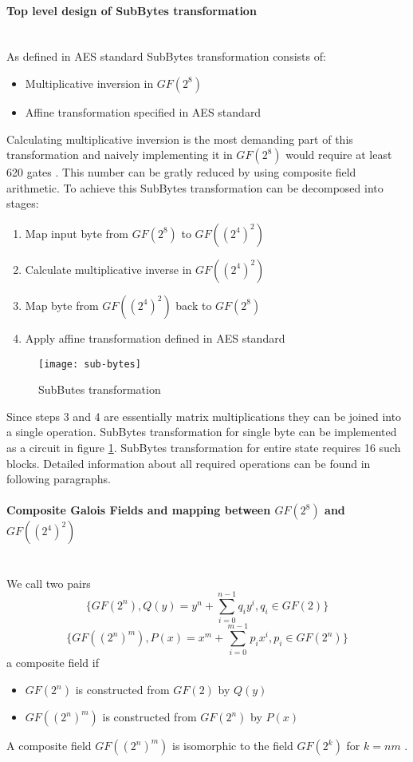 \paragraph{Top level design of SubBytes transformation}\mbox{}\\
As defined in AES standard \cite{aes-standard} SubBytes transformation consists of:
\begin{itemize}[nolistsep]
\item Multiplicative inversion in $GF(2^8)$
\item Affine transformation specified in AES standard \cite{aes-standard}
\end{itemize}
Calculating multiplicative inversion is the most demanding part of this transformation and naively implementing it in $GF(2^8)$ would require at least 620 gates \cite{vlsi}. This number can be gratly reduced by using composite field arithmetic. To achieve this SubBytes transformation can be decomposed into stages:
\begin{enumerate}[nolistsep]
\item Map input byte from $GF(2^8)$ to $GF((2^4)^2)$ 
\item Calculate multiplicative inverse in $GF((2^4)^2)$
\item Map byte from $GF((2^4)^2)$ back to $GF(2^8)$
\item Apply affine transformation defined in AES standard \cite{aes-standard}
\end{enumerate}

\begin{figure}[!h]
\centering
\texttt{[image: sub-bytes]}
\caption{SubButes transformation}
\label{fig:sub-single-byte}
\end{figure}

Since steps 3 and 4 are essentially matrix multiplications they can be joined into a single operation. SubBytes transformation for single byte can be implemented as a circuit in figure \ref{fig:sub-single-byte}. SubBytes transformation for entire state requires 16 such blocks. Detailed information about all required operations can be found in following paragraphs.

\paragraph{Composite Galois Fields and mapping between $GF(2^8)$ and $GF((2^4)^2)$}\mbox{}\\
We call two pairs
\begin{equation*}
\{GF(2^n), Q(y) = y^n + \sum_{i=0}^{n-1} q_i y^i, q_i \in GF(2) \}
\end{equation*}
\begin{equation*}
\{GF((2^n)^m), P(x) = x^m + \sum_{i=0}^{m-1} p_i x^i, p_i \in GF(2^n) \}
\end{equation*}
a composite field \cite{vlsi} if 
\begin{itemize}[nolistsep]
\item $GF(2^n)$ is constructed from $GF(2)$ by $Q(y)$
\item $GF((2^n)^m)$ is constructed from $GF(2^n)$ by $P(x)$
\end{itemize}
A composite field $GF((2^n)^m)$ is isomorphic to the field $GF(2^k)$ for $k = nm$ \cite{vlsi}.

